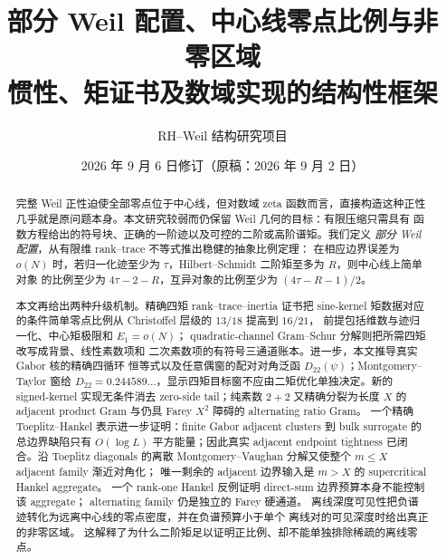 \documentclass[UTF8,11pt,a4paper]{ctexart}
\title{部分 Weil 配置、中心线零点比例与非零区域\\
\large 惯性、矩证书及数域实现的结构性框架}
\author{RH--Weil 结构研究项目}
\date{2026 年 9 月 6 日修订（原稿：2026 年 9 月 2 日）}
\theoremstyle{definition}
\theoremstyle{remark}
\begin{document}
\maketitle

\begin{abstract}
完整 Weil 正性迫使全部零点位于中心线，但对数域 zeta 函数而言，直接构造这种正性
几乎就是原问题本身。本文研究较弱而仍保留 Weil 几何的目标：有限压缩只需具有
函数方程给出的符号块、正确的一阶迹以及可控的二阶或高阶谱矩。我们定义
\emph{部分 Weil 配置}，从有限维 rank--trace 不等式推出稳健的抽象比例定理：
在相应边界误差为 $o(N)$ 时，若归一化迹至少为 $\tau$，Hilbert--Schmidt 二阶矩至多为 $R$，则中心线上简单对象
的比例至少为 $4\tau-2-R$，互异对象的比例至少为 $(4\tau-R-1)/2$。

本文再给出两种升级机制。精确四矩 rank--trace--inertia 证书把 sine-kernel
矩数据对应的条件简单零点比例从 Christoffel 层级的 $13/18$ 提高到 $16/21$，
前提包括维数与迹归一化、中心矩极限和 $E_1=o(N)$；
quadratic-channel Gram--Schur 分解则把所需四矩改写成背景、线性素数项和
二次素数项的有符号三通道账本。进一步，本文推导真实 Gabor 核的精确四循环
恒等式以及任意偶窗的配对对角泛函 $D_{22}(\psi)$；Montgomery--Taylor 窗给
$D_{22}=0.244589\ldots$，显示四矩目标窗不应由二矩优化单独决定。新的
signed-kernel 实现无条件消去 zero-side tail；纯素数 $2+2$ 又精确分裂为长度
$X$ 的 adjacent product Gram 与仍具 Farey $X^2$ 障碍的 alternating ratio Gram。
一个精确 Toeplitz--Hankel 表示进一步证明：finite Gabor adjacent clusters
到 bulk surrogate 的总边界缺陷只有 $O(\log L)$ 平方能量；因此真实 adjacent
endpoint tightness 已闭合。沿 Toeplitz diagonals 的离散
Montgomery--Vaughan 分解又使整个 $m\le X$ adjacent family 渐近对角化；
唯一剩余的 adjacent 边界输入是 $m>X$ 的 supercritical Hankel aggregate。
一个 rank-one Hankel 反例证明 direct-sum 边界预算本身不能控制该 aggregate；
alternating family 仍是独立的 Farey 硬通道。
离线深度可见性把负谱迹转化为远离中心线的零点密度，并在负谱预算小于单个
离线对的可见深度时给出真正的非零区域。
这解释了为什么二阶矩足以证明正比例、却不能单独排除稀疏的离线零点。


\end{abstract}
\end{document}
